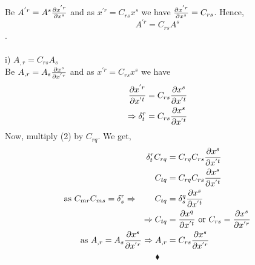  Be $ A^{'r} = A^{s}\pdv{x^{'r}}{x^s}$ and as $x^{'r} = C_{rs}x^{s}$  we have $\pdv{x^{'r}}{x^s} = C_{rs}$. Hence,$$ A^{'r} = C_{rs}A^{s}$$.\\\\
 i) $ A_{,r} = C_{rs}A_{s}$\\
 Be $ A_{,r} = A_{s}\pdv{x^{s}}{x^{'r}}$ and as $x^{'r} = C_{rs}x^{s}$  we have
\begin{align}
\pdv{x^{'r}}{x^{'t}} &= C_{rs}\pdv{x^{s}}{x^{'t}}\\
\Rightarrow \delta^{r}_{t} &= C_{rs}\pdv{x^{s}}{x^{'t}}
  \end{align}
  Now, multiply (2) by $C_{rq}$. We get,
  \begin{align}
 \delta^{r}_{t}C_{rq} &= C_{rq}C_{rs}\pdv{x^{s}}{x^{'t}}\\
 \ C_{tq} &= C_{rq}C_{rs}\pdv{x^{s}}{x^{'t}}\\
 \text{as }C_{mr}C_{ms} = \delta^r_s \Rightarrow \quad \quad  C_{tq} &= \delta^q_s\pdv{x^{s}}{x^{'t}}\\
 \Rightarrow   C_{tq} &= \pdv{x^{q}}{x^{'t}} \text{  or  }  C_{rs} = \pdv{x^{s}}{x^{'r}}\\
 \text{  as  } A_{,r} = A_{s}\pdv{x^{s}}{x^{'r}} \Rightarrow A_{,r} &= C_{rs}\pdv{x^{s}}{x^{'r}}
  \end{align}
$$\blacklozenge$$
\pagebreak[4]


